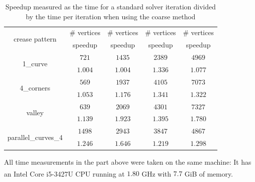 \documentclass[a4paper,twoside,12pt,nochapterprefix]{scrbook}
\begin{document}
\begin{table}
\centering
\begin{tabular}{|c|c|c|c|c|}
\hline
\multirow{2}{*}{crease pattern} & \# vertices & \# vertices & \# vertices & \# vertices \\ \cline{2-5}
 & speedup & speedup & speedup & speedup \\ \hline
 
\multirow{2}{*}{1\_curve} & $721$ & $1435$ & $2389$ & $4969$ \\ \cline{2-5}
 & $1.004$ & $1.004$ & $1.336$ & $1.077$ \\ \hline
\multirow{2}{*}{4\_corners} & $569$ & $1937$ & $4105$ & $7073$ \\ \cline{2-5}
 & $1.053$ & $1.176$ & $1.341$ & $1.322$ \\ \hline
\multirow{2}{*}{valley} & $639$ & $2069$ & $4301$ & $7327$ \\ \cline{2-5}
 & $1.139$ & $1.923$ & $1.395$ & $1.780$ \\ \hline
\multirow{2}{*}{parallel\_curves\_4} & $1498$ & $2943$ & $3847$ & $4867$ \\ \cline{2-5}
 & $1.246$ & $1.646$ & $1.219$ & $1.298$ \\ \hline
\end{tabular}
\caption{Speedup measured as the time for a standard solver iteration divided by the time per iteration when using the coarse method}
\label{tab:timing}
\end{table}
All time measurements in the part above were taken on the same machine: It has an Intel\textsuperscript{\textregistered} Core\textsuperscript{\texttrademark} i5-3427U CPU running at $1.80$ GHz with $7.7$ GiB of memory.
\end{document}
